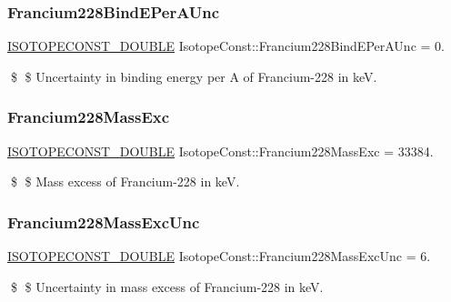 \subsubsection{\texorpdfstring{Francium228\+Bind\+E\+Per\+A\+Unc}{Francium228BindEPerAUnc}}
{\footnotesize\ttfamily \mbox{\hyperlink{group___isotope_const-_macros_ga8f45a7272ce02c0b4c65c44636ed719a}{I\+S\+O\+T\+O\+P\+E\+C\+O\+N\+S\+T\+\_\+\+D\+O\+U\+B\+LE}} Isotope\+Const\+::\+Francium228\+Bind\+E\+Per\+A\+Unc = 0.}

\$ \$ Uncertainty in binding energy per A of Francium-\/228 in keV. \mbox{\label{group___isotope_const-_francium-_fr228_ga8e74dfd426c3e7320879a90db9031702}} 
\subsubsection{\texorpdfstring{Francium228\+Mass\+Exc}{Francium228MassExc}}
{\footnotesize\ttfamily \mbox{\hyperlink{group___isotope_const-_macros_ga8f45a7272ce02c0b4c65c44636ed719a}{I\+S\+O\+T\+O\+P\+E\+C\+O\+N\+S\+T\+\_\+\+D\+O\+U\+B\+LE}} Isotope\+Const\+::\+Francium228\+Mass\+Exc = 33384.}

\$ \$ Mass excess of Francium-\/228 in keV. \mbox{\label{group___isotope_const-_francium-_fr228_gabd20ce315492c3f0a0e1e65393b97ac4}} 
\subsubsection{\texorpdfstring{Francium228\+Mass\+Exc\+Unc}{Francium228MassExcUnc}}
{\footnotesize\ttfamily \mbox{\hyperlink{group___isotope_const-_macros_ga8f45a7272ce02c0b4c65c44636ed719a}{I\+S\+O\+T\+O\+P\+E\+C\+O\+N\+S\+T\+\_\+\+D\+O\+U\+B\+LE}} Isotope\+Const\+::\+Francium228\+Mass\+Exc\+Unc = 6.}

\$ \$ Uncertainty in mass excess of Francium-\/228 in keV. \mbox{\label{group___isotope_const-_francium-_fr228_gaa94d4bb05d1c2cbd4bc67aff13b17702}} 
